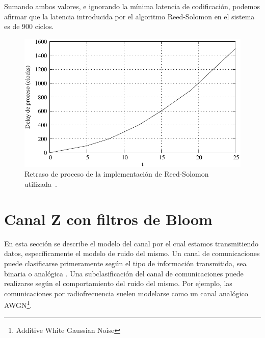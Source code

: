 Sumando ambos valores, e ignorando la mínima latencia de codificación, podemos afirmar que la latencia introducida por el algoritmo Reed-Solomon en el sistema es de 900 ciclos.

\begin{figure}[t]
  \centering
  \includegraphics[width=0.8 \textwidth]{graphs/rsDelay.pdf} 
  \caption{Retraso de proceso de la implementación de Reed-Solomon utilizada~\cite{Xilinx:DS252}.}
  \label{fig_rslat}
\end{figure}


% 

\section{Canal Z con filtros de Bloom}

En esta sección se describe el modelo del canal por el cual estamos transmitiendo datos, específicamente el modelo de ruido del mismo. 
Un canal de comunicaciones puede clasificarse primeramente según el tipo de información transmitida, sea binaria o analógica \cite{MacKay:2002}.
Una subclasificación del canal de comunicaciones puede realizarse según el comportamiento del ruido del mismo.
Por ejemplo, las comunicaciones por radiofrecuencia suelen modelarse como un canal analógico AWGN\footnote{Additive White Gaussian Noise}. 

